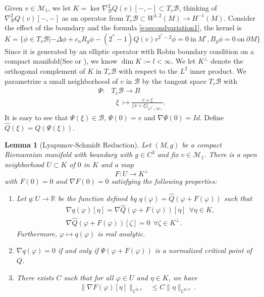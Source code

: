 \documentclass[12pt]{amsart}
\newtheorem{lemma}[theorem]{Lemma}
\newcommand{\R}{{\mathbb{R}}}
\newcommand{\M}{{\mathcal{M}}}
\newcommand{\vphi}{\varphi}
\newcommand{\na}{{\nabla}}
\newcommand{\B}{\mathcal{B}}
\begin{document}
Given $v \in \mathcal{M}_1$, we let $K= \ker \nabla^2_{\B} Q(v)[-,-]\subset T_v\B$, thinking of $\nabla^2_{\B} Q(v)[-,-]$ as  an operator from $T_v\B\subset W^{1,2}(M) \rightarrow H^{-1}(M)$. Consider the effect of the boundary and the formula \eqref{e:secondvariation1}, the kernel is
\begin{equation}
    K=\{ \phi \in T_v\B|-\Delta \phi +c_n R_g \phi -(2^*-1)Q(v)v^{2^*-2}\phi =0 ~\text{in}~ M^\circ, B_g \phi =0 ~ \text{on}~ \partial M\}
\end{equation}
Since it is generated by an elliptic operator with Robin boundary condition on a compact manifold(See \cite{ADN64} or \cite{GT}), we know $\dim K := l < \infty$. We let $K^\perp$ denote the orthogonal complement of $K$ in $T_v\B$ with respect to the $L^2$ inner product. We parametrize a small neighborhood of $v$ in $\B$ by the tangent space $T_v \B$ with
\begin{align*}
    \Psi: &T_v\B \to B  \\
    &~~~\xi ~\mapsto \frac{v+\xi}{||v+\xi||_{L^{2^*}(M)}}.
\end{align*}
It is easy to see that $\Psi(\xi) \in \B $, $\Psi(0)= v$ and $\na \Psi (0) = Id$. Define $\hat{Q}(\xi)=Q(\Psi(\xi))$.
\begin{lemma}[Lyapunov-Schmidt Reduction]\label{lem: LS reduction}
	Let $(M,g)$ be a compact Riemannian manifold with boundary with $g\in C^3$ and fix $v \in \mathcal{\M}_1$. There is a open neighborhood $U\subset K$ of $0$ in $K$
	and a map 
	\[
	F: U \to K^{\perp} 
	\]
	 with $F(0)=0$ and $\nabla F(0)=0$ satisfying the following properties:
\begin{enumerate}
	\item\label{item: LS property 1} Let $q: U\to \R$ be the function defined by $q(\vphi)= \hat{Q}( \vphi + F(\vphi))$  such that
    \begin{align}
        &\na q(\vphi)[\eta]= \na \hat{Q}(\vphi +F(\vphi))[\eta]  ~~\forall \eta \in K,\\
        &\na \hat{Q}(\vphi +F(\vphi))[\zeta]=0~~ \forall \zeta \in K^\perp.
    \end{align}
	Furthermore, $\vphi \mapsto q(\vphi)$ is real analytic.

\item \label{item: prop2}$\na q(\vphi)=0$ if and only if $\Psi(\vphi+F(\vphi))$  is a normalized critical point of $Q$.

\item\label{item schauder estimates} There exists $C$ such that for all $ \vphi \in  U$ and $\eta \in K$, we have
		\begin{equation}\label{eqn: estimates for DF}
	\begin{split}
\| \nabla F(\vphi)[\eta] \|_{C^{2,\alpha}}  &\leq C \|\eta\|_{C^{0,\alpha}}\,.
	\end{split}
	\end{equation}

\end{enumerate}
\end{lemma} 
\end{document}
